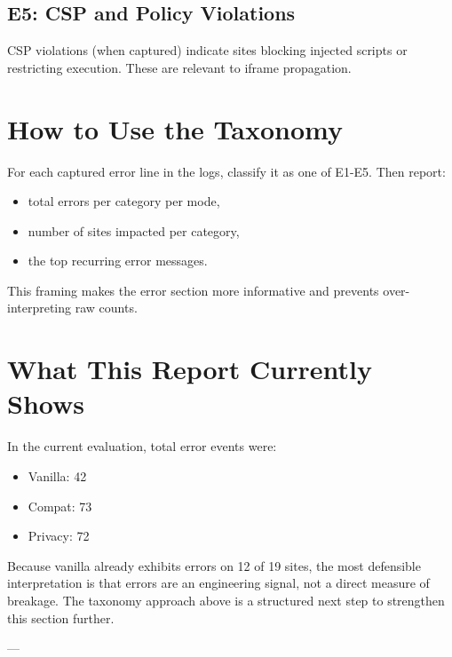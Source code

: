 \documentclass[11pt]{report}
\begin{document}
\subsection{E5: CSP and Policy Violations}

CSP violations (when captured) indicate sites blocking injected scripts or restricting execution. These are relevant to iframe propagation.

\section{How to Use the Taxonomy}

For each captured error line in the logs, classify it as one of E1-E5. Then report:

\begin{itemize}
    \item total errors per category per mode,
    \item number of sites impacted per category,
    \item the top recurring error messages.
\end{itemize}

This framing makes the error section more informative and prevents over-interpreting raw counts.

\section{What This Report Currently Shows}

In the current evaluation, total error events were:

\begin{itemize}
    \item Vanilla: 42
    \item Compat: 73
    \item Privacy: 72
\end{itemize}

Because vanilla already exhibits errors on 12 of 19 sites, the most defensible interpretation is that errors are an engineering signal, not a direct measure of breakage. The taxonomy approach above is a structured next step to strengthen this section further.

\clearpage

---
\end{document}
